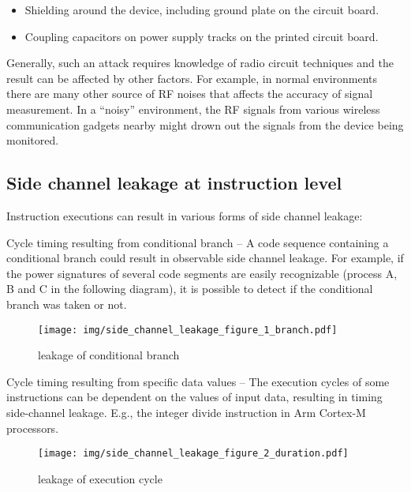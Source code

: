 \documentclass[a4paper,]{report}
\makeatletter
\providecommand{\tightlist}{%
  \setlength{\itemsep}{0pt}\setlength{\parskip}{0pt}}
\newcounter{figno}
\newenvironment{fignos:no-prefix-figure-caption}{
  \caption@ifcompatibility{}{
    \let\oldthefigure\thefigure
    \let\oldtheHfigure\theHfigure
    \renewcommand{\thefigure}{figno:\thefigno}
    \renewcommand{\theHfigure}{figno:\thefigno}
    \stepcounter{figno}
    \captionsetup{labelformat=empty}
  }
}{
  \caption@ifcompatibility{}{
    \captionsetup{labelformat=default}
    \let\thefigure\oldthefigure
    \let\theHfigure\oldtheHfigure
    \addtocounter{figure}{-1}
  }
}
\makeatother
\begin{document}
\begin{itemize}
\tightlist
\item
  Shielding around the device, including ground plate on the circuit
  board.
\item
  Coupling capacitors on power supply tracks on the printed circuit
  board.
\end{itemize}

Generally, such an attack requires knowledge of radio circuit techniques
and the result can be affected by other factors. For example, in normal
environments there are many other source of RF noises that affects the
accuracy of signal measurement. In a ``noisy'' environment, the RF
signals from various wireless communication gadgets nearby might drown
out the signals from the device being monitored.

\hypertarget{side-channel-leakage-at-instruction-level}{%
\subsection{Side channel leakage at instruction
level}\label{side-channel-leakage-at-instruction-level}}

Instruction executions can result in various forms of side channel
leakage:

Cycle timing resulting from conditional branch -- A code sequence
containing a conditional branch could result in observable side channel
leakage. For example, if the power signatures of several code segments
are easily recognizable (process A, B and C in the following diagram),
it is possible to detect if the conditional branch was taken or not.

\begin{fignos:no-prefix-figure-caption}

\begin{figure}
\centering
\texttt{[image: img/side\_channel\_leakage\_figure\_1\_branch.pdf]}
\caption{leakage of conditional branch}
\end{figure}

\end{fignos:no-prefix-figure-caption}

Cycle timing resulting from specific data values -- The execution cycles
of some instructions can be dependent on the values of input data,
resulting in timing side-channel leakage. E.g., the integer divide
instruction in Arm Cortex-M processors.

\begin{fignos:no-prefix-figure-caption}

\begin{figure}
\centering
\texttt{[image: img/side\_channel\_leakage\_figure\_2\_duration.pdf]}
\caption{leakage of execution cycle}
\end{figure}

\end{fignos:no-prefix-figure-caption}
\end{document}
